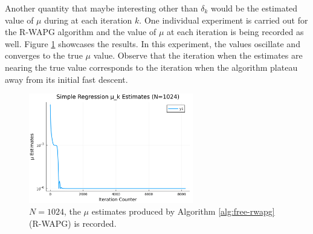 \documentclass[12pt]{article}
\begin{document}
            \par
            Another quantity that maybe interesting other than $\delta_k$ would be the estimated value of $\mu$ during at each iteration $k$. 
            One individual experiment is carried out for the R-WAPG algorithm and the value of $\mu$ at each iteration is being recorded as well. 
            Figure \ref{fig:simple-quadratic-r-wapg-mu-estimates} showcases the results. 
            In this experiment, the values oscillate and converges to the true $\mu$ value. 
            Observe that the iteration when the estimates are nearing the true value corresponds to the iteration when the algorithm plateau away from its initial fast descent. 
            \begin{figure}[H]
                \centering
                \includegraphics[width=0.64\textwidth]{assets/simple_regression_loss_sc_estimates_1024.png}
                \caption{$N = 1024$, the $\mu$ estimates produced by Algorithm \ref{alg:free-rwapg} (R-WAPG) is recorded. }
                \label{fig:simple-quadratic-r-wapg-mu-estimates}
            \end{figure}
\end{document}
